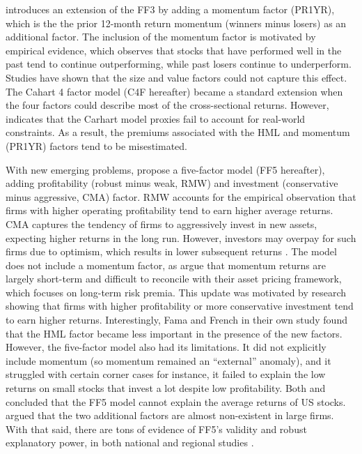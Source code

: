  introduces an extension of the FF3 by adding a momentum factor (PR1YR), which is the  the prior 12-month return momentum (winners minus losers) as an additional factor. The inclusion of the momentum factor is motivated by empirical evidence, which observes that stocks that have performed well in the past tend to continue outperforming, while past losers continue to underperform. Studies have shown that the size and value factors could not capture this effect. The Cahart 4 factor model (C4F hereafter) became a standard extension when the four factors could describe most of the cross-sectional returns. However,  indicates that the Carhart model proxies fail to account for real-world constraints. As a result, the premiums associated with the HML and momentum (PR1YR) factors tend to be misestimated.

With new emerging problems,  propose a five-factor model (FF5 hereafter), adding profitability (robust minus weak, RMW) and investment (conservative minus aggressive, CMA) factor. RMW accounts for the empirical observation that firms with higher operating profitability tend to earn higher average returns. CMA captures the tendency of firms to aggressively invest in new assets, expecting higher returns in the long run. However, investors may overpay for such firms due to optimism, which results in lower subsequent returns \cite{titman_2004}. The model does not include a momentum factor, as  argue that momentum returns are largely short-term and difficult to reconcile with their asset pricing framework, which focuses on long-term risk premia. This update was motivated by research showing that firms with higher profitability or more conservative investment tend to earn higher returns. Interestingly, Fama and French in their own study found that the HML factor became less important in the presence of the new factors.  However, the five-factor model also had its limitations. It did not explicitly include momentum (so momentum remained an “external” anomaly), and it struggled with certain corner cases for instance, it failed to explain the low returns on small stocks that invest a lot despite low profitability. Both  and  concluded that the FF5 model cannot explain
the average returns of US stocks.  argued that the two additional factors are almost non-existent in large firms. With that said, there are tons of evidence of FF5's validity and robust explanatory power, in both national and regional studies \cite{sohor_litreview_2024}.

